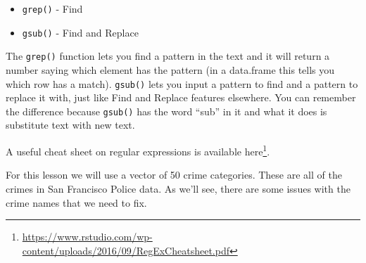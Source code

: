 \documentclass[
]{krantz}
\providecommand{\tightlist}{%
  \setlength{\itemsep}{0pt}\setlength{\parskip}{0pt}}
\renewcommand{\href}[2]{#2\footnote{\url{#1}}}
\begin{document}
\begin{itemize}
\tightlist
\item
  \texttt{grep()} - Find
\item
  \texttt{gsub()} - Find and Replace
\end{itemize}

The \texttt{grep()} function lets you find a pattern in the text and it will return a number saying which element has the pattern (in a data.frame this tells you which row has a match). \texttt{gsub()} lets you input a pattern to find and a pattern to replace it with, just like Find and Replace features elsewhere. You can remember the difference because \texttt{gsub()} has the word ``sub'' in it and what it does is substitute text with new text.

A useful cheat sheet on regular expressions is available \href{https://www.rstudio.com/wp-content/uploads/2016/09/RegExCheatsheet.pdf}{here}.

For this lesson we will use a vector of 50 crime categories. These are all of the crimes in San Francisco Police data. As we'll see, there are some issues with the crime names that we need to fix.
\end{document}
